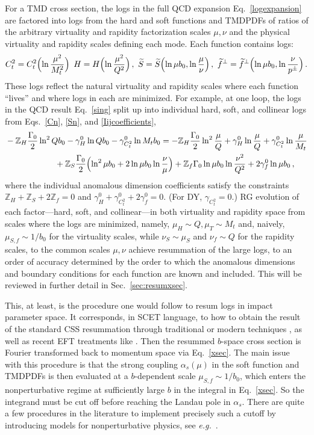 \documentclass[a4,letterpaper,11pt]{article}
\newcommand{\nn}{\nonumber}
\newcommand{\be}{\begin{equation}}
\newcommand{\ee}{\end{equation}}
\newcommand{\as}{\alpha_s}
\newcommand{\eg}{\emph{e.g.}~}
\newcommand{\zed}{\mathbb{Z}}
\newcommand{\wt}{\widetilde}
\newcommand{\eq}[1]{Eq.~\eqref{#1}}
\newcommand{\eqss}[3]{Eqs.~\eqref{#1}, \eqref{#2}, and \eqref{#3}}
\renewcommand{\sec}[1]{Sec.~\ref{sec:#1}}
\begin{document}
For a TMD cross section, the logs in the full QCD expansion \eq{logexpansion} are factored into logs from the hard and soft functions and TMDPDFs of ratios of the arbitrary virtuality and rapidity factorization scales $\mu,\nu$ and the physical virtuality and rapidity scales defining each mode. Each function contains logs:
\be
C_t^2 = C_t^2\Bigl(\ln \frac{\mu^2}{M_t^2}\Bigr)\,\ H = H\Bigl(\ln \frac{\mu^2}{Q^2}\Bigr)\,,\ \wt S = \wt S\Bigl(\ln\mu b_0,\ln\frac{\mu}{\nu}\Bigr)\,,\ \wt f^\perp = \wt f^\perp \Bigl(\ln \mu b_0,\ln\frac{\nu}{p^\pm}\Bigr)\,.
\ee
These logs reflect the natural virtuality and rapidity scales where each function ``lives'' and where logs in each are minimized. For example, at one loop, the logs in the QCD result \eq{sing} split up into individual hard, soft, and collinear logs from \eqss{Cn}{Sn}{Iijcoefficients},
\begin{align}
&-\zed_H \frac{\Gamma_0}{2} \ln^2 Qb_0 - \gamma_H^0 \ln Qb_0- \gamma_{C_t^2}^0 \ln M_tb_0 = - \zed_H \frac{\Gamma_0}{2} \ln^2\frac{\mu}{Q} + \gamma_H^0\ln\frac{\mu}{Q}  + \gamma_{C_t^2}^0\ln\frac{\mu}{M_t} \nn\\
 &\qquad\qquad\qquad   + \zed_S\frac{\Gamma_0}{2}\Bigl(\ln^2 \mu b_0 + 2\ln\mu b_0 \ln\frac{\nu}{\mu}\Bigr)  + \zed_f \Gamma_0 \ln\mu b_0\ln\frac{\nu^2}{Q^2} + 2\gamma_f^0 \ln\mu b_0\,, 
\end{align}
where the individual anomalous dimension coefficients satisfy the constraints $\zed_H + \zed_S + 2\zed_f = 0$ and $\gamma_H^0+\gamma_{C_t^2}^0 + 2\gamma_f^0 = 0$. (For DY, $\gamma_{C_t^2}=0$.) RG evolution of each factor---hard, soft, and collinear---in both virtuality and rapidity space from scales where the logs are minimized, namely, $\mu_H\sim Q, \mu_T \sim M_t$ and, naively, $\mu_{S,f}\sim 1/b_0$ for the virtuality scales, while $\nu_S\sim \mu_S$ and $\nu_f\sim Q$ for the rapidity scales, to the common scales $\mu,\nu$ achieve resummation of the large logs, to an order of accuracy determined by the order to which the anomalous dimensions and boundary conditions for each function are known and included. This will be reviewed in further detail in \sec{resumxsec}.

This, at least, is the procedure one would follow to resum logs in impact parameter space. It corresponds, in SCET language, to how to obtain the result of the standard CSS resummation through traditional \cite{Collins:1984kg} or modern techniques \cite{Collins:2011zzd}, as well as recent EFT treatments like \cite{Neill:2015roa}. Then the resummed $b$-space cross section is Fourier transformed back to momentum space via \eq{xsec}. The main issue with this procedure is that the strong coupling $\as(\mu)$ in the soft function and TMDPDFs is then evaluated at a $b$-dependent scale $\mu_{S,f}\sim 1/b_0$, which enters the nonperturbative regime at sufficiently large $b$ in the integral in \eq{xsec}. So the integrand must be cut off before reaching the Landau pole in $\as$. There are quite a few procedures in the literature to implement precisely such a cutoff by introducing models for nonperturbative physics, see \eg \cite{Qiu:2000hf,Sun:2013dya,DAlesio:2014mrz,Collins:2014jpa,Scimemi:2017etj}.
\end{document}
